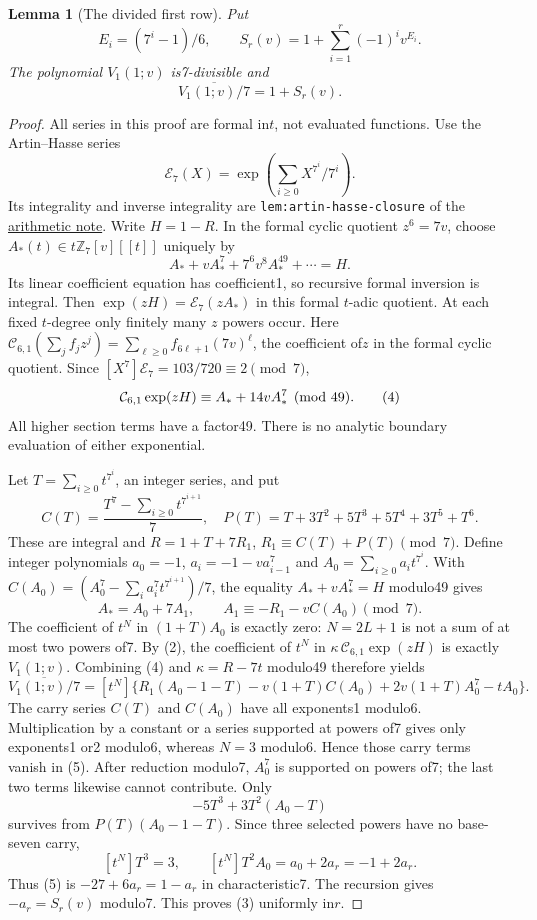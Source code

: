 \documentclass[11pt]{article}
\newtheorem{lemma}{Lemma}
\begin{document}
\begin{lemma}[The divided first row]\label{lem:first-row}
Put
\[
 E_i=(7^i-1)/6,\qquad
 S_r(v)=1+\sum_{i=1}^r(-1)^iv^{E_i}.
\]
The polynomial $V_1(1;v)$ is7-divisible and
\[
                       \overline{V_1(1;v)/7}=1+S_r(v). \tag{3}
\]
\end{lemma}
\begin{proof}
All series in this proof are formal in$t$, not evaluated functions.
Use the Artin--Hasse series
\[
 \mathcal E_7(X)=\exp\left(\sum_{i\ge0}X^{7^i}/7^i\right).
\]
Its integrality and inverse integrality are
\texttt{lem:artin-hasse-closure} of the
\href{ARITHMETIC_FRONTIER_TERMINAL_ORDERS.tex}{arithmetic note}.
Write $H=1-R$.
In the formal cyclic quotient $z^6=7v$, choose
$A_*(t)\in t\mathbb Z_7[v][[t]]$ uniquely by
\[
 A_*+vA_*^7+7^6v^8A_*^{49}+\cdots=H.
\]
Its linear coefficient equation has coefficient1, so recursive
formal inversion is integral. Then
$\exp(zH)=\mathcal E_7(zA_*)$ in this formal $t$-adic quotient.
At each fixed $t$-degree only finitely many $z$ powers occur.
Here $\mathcal C_{6,1}(\sum_jf_jz^j)=
\sum_{\ell\ge0}f_{6\ell+1}(7v)^\ell$, the coefficient of$z$
in the formal cyclic quotient.
Since $[X^7]\mathcal E_7=103/720\equiv2\pmod7$,
\[
 {\cal C}_{6,1}\exp(zH)
          \equiv A_*+14vA_*^7\pmod{49}.                 \tag{4}
\]
All higher section terms have a factor49.
There is no analytic boundary evaluation of either exponential.

Let $T=\sum_{i\ge0}t^{7^i}$, an integer series, and put
\[
 C(T)=\frac{T^7-\sum_{i\ge0}t^{7^{i+1}}}{7},\quad
 P(T)=T+3T^2+5T^3+5T^4+3T^5+T^6.
\]
These are integral and
$R=1+T+7R_1$, $R_1\equiv C(T)+P(T)\pmod7$.
Define integer polynomials $a_0=-1$,
$a_i=-1-va_{i-1}^7$ and $A_0=\sum_{i\ge0}a_it^{7^i}$.
With
$C(A_0)=(A_0^7-\sum_i a_i^7t^{7^{i+1}})/7$,
the equality $A_*+vA_*^7=H$ modulo49 gives
\[
 A_*=A_0+7A_1,\qquad
                   A_1\equiv-R_1-vC(A_0)\pmod7.
\]
The coefficient of $t^N$ in $(1+T)A_0$ is exactly zero:
$N=2L+1$ is not a sum of at most two powers of7.
By (2), the coefficient of $t^N$ in
$\kappa\,\mathcal C_{6,1}\exp(zH)$ is exactly $V_1(1;v)$.
Combining (4) and $\kappa=R-7t$ modulo49 therefore yields
\[
 \overline{V_1(1;v)/7}
 =[t^N]\{R_1(A_0-1-T)-v(1+T)C(A_0)
                    +2v(1+T)A_0^7-tA_0\}.             \tag{5}
\]
The carry series $C(T)$ and $C(A_0)$ have all exponents1
modulo6. Multiplication by a constant or a series supported
at powers of7 gives only exponents1 or2 modulo6,
whereas $N=3$ modulo6. Hence those carry terms vanish in (5).
After reduction modulo7, $A_0^7$ is supported on powers of7;
the last two terms likewise cannot contribute.
Only
\[
                     -5T^3+3T^2(A_0-T)
\]
survives from $P(T)(A_0-1-T)$.
Since three selected powers have no base-seven carry,
\[
 [t^N]T^3=3,\qquad [t^N]T^2A_0=a_0+2a_r=-1+2a_r.
\]
Thus (5) is $-27+6a_r=1-a_r$ in characteristic7.
The recursion gives $-a_r=S_r(v)$ modulo7.
This proves (3) uniformly in$r$.
\end{proof}
\end{document}
